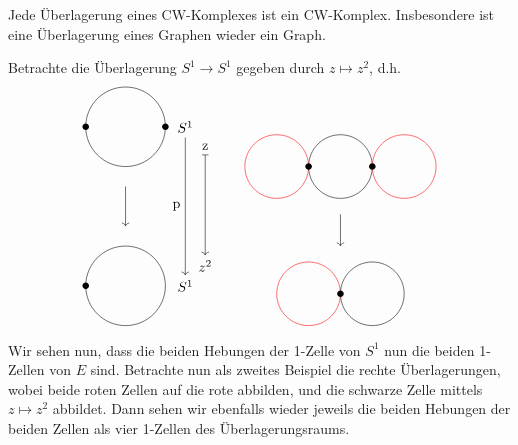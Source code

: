 
\begin{theorem}\label{thm:überlagerung-von-cw-komplex-ist-überlagerung}
    Jede Überlagerung eines CW-Komplexes ist ein CW-Komplex. Insbesondere ist eine Überlagerung eines Graphen wieder ein Graph.
\end{theorem}

\begin{example}
    Betrachte die Überlagerung $S^1 \to  S^1$ gegeben durch $z \mapsto z^2$, d.h.
\[
    \begin{tikzpicture}
        \draw (0,2) circle (1);
        \node[fill, circle, scale=0.5] at (1,2) {};
        \node[fill, circle, scale=0.5] at (-1,2) {};
        \draw (0,-2) circle (1);
        \node[fill, circle, scale=0.5] at (-1,-2) {};
        \draw[->] (0,0.5) -- (0,-0.5);
        \node (A) at (1.5,2) {$S^1$};
        \node (A1) at (2,1.5) {z};
        \node (B) at (1.5, -2) {$S^1$};
        \node (B1) at (2,-1.5) {$z^2$};
        \draw[->] (A.south) -- (B.north) node[anchor=east, midway] {p};
        \draw[|->] (A1.south) -- (B1.north);
    \end{tikzpicture}
    \qquad
    \begin{tikzpicture}[scale=0.8]
        \draw (0,2) circle (1);
        \draw[red] (-2,2) circle (1);
        \draw[red] (2,2) circle (1);
        \node[fill, circle, scale=0.5] at (1,2) {};
        \node[fill, circle, scale=0.5] at (-1,2) {};
        \draw[red] (-1,-2) circle (1);
        \draw (1,-2) circle (1);
        \node[fill, circle, scale=0.5] at (0,-2) {};
        \draw[->] (0,0.5) -- (0,-0.5);
    \end{tikzpicture}
\]
Wir sehen nun, dass die beiden Hebungen der 1-Zelle von $S^1$ nun die beiden 1-Zellen von  $E$ sind. Betrachte nun als zweites Beispiel die rechte Überlagerungen, wobei beide roten Zellen auf die rote abbilden, und die schwarze Zelle mittels $z \mapsto z^2$ abbildet. Dann sehen wir ebenfalls wieder jeweils die beiden Hebungen der beiden Zellen als vier 1-Zellen des Überlagerungsraums.
\end{example}

